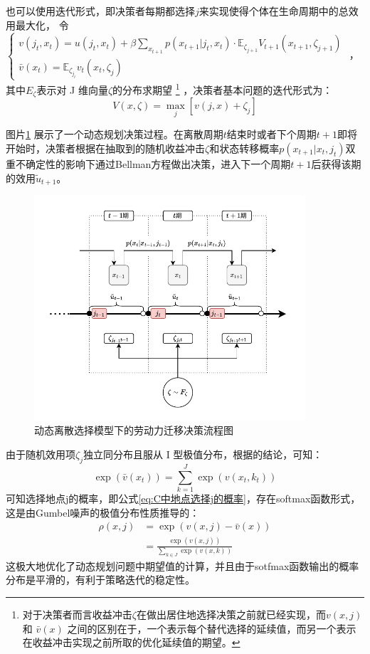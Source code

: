 \documentclass[
  a4paper,
  zihao=-4,
  fontset=mac,
  AutoFakeBold,
  AutoFakeSlant,
  oneside]{ctexbook}
\let\oldfootnote\footnote
\renewcommand{\footnote}[1]{%
  \oldfootnote{\setstretch{1.5}#1}%
}
\begin{document}
也可以使用迭代形式，即决策者每期都选择$j$来实现使得个体在生命周期中的总效用最大化，
令
$\begin{cases}
  v(j_{t},x_{t})=u(j_{t} ,x_{t})+\beta \sum_{x_{t+1}} p(x_{t+1}|j_t,x_t) \cdot \mathbb{E}_{\zeta_{j+1}} V_{t+1}(x_{t+1},\zeta_{j+1})
  \\
  \bar v(x_{t})=\mathbb{E}_{\zeta_{j_t}} v_{t}(x_{t},\zeta_{j})
\end{cases}$
，其中$E_{\zeta}$表示对 J 维向量$\zeta$的分布求期望\footnote{对于决策者而言收益冲击$\zeta$在做出居住地选择决策之前就已经实现，而$v(x,j)$ 和 $\bar v(x)$ 之间的区别在于，一个表示每个替代选择的延续值，而另一个表示在收益冲击实现之前所取的优化延续值的期望。}，决策者基本问题的迭代形式为：
\begin{equation}
V(x,\zeta)=\max\limits_{j}[v(j,x)+\zeta_{j}]
\end{equation}

图片\ref{fig:migration_flow_resized2} 展示了一个动态规划决策过程。在离散周期$t$结束时或者下个周期$t+1$即将开始时，决策者根据在抽取到的随机收益冲击$\zeta$和状态转移概率$p(x_{t+1}|x_t,j_t)$双重不确定性的影响下通过Bellman方程做出决策，进入下一个周期$t+1$后获得该期的效用$\tilde u_{t+1}$。

\begin{figure}[!ht]
\centering
\caption{动态离散选择模型下的劳动力迁移决策流程图}
\label{fig:migration_flow_resized2}
\includegraphics[width=0.9\textwidth]{images/dynamicsequence2.drawio.pdf}
\end{figure}

由于随机效用项$\zeta_j$独立同分布且服从 I 型极值分布，根据\textcite{mcfaddenConditionalLogitAnalysis1973,rustOptimalReplacementGMC1987,rustStructuralEstimationMarkov1994}的结论，可知：
\begin{equation}
  \exp(\bar v(x_t))=\sum\limits_{k=1}^{J}\exp(v(x_t,k_t))
\end{equation}
可知选择地点j的概率，即公式\ref{eq:C中地点选择j的概率}，存在softmax函数形式，这是由Gumbel噪声的极值分布性质推导的：
\begin{align}
\rho(x,j)&=\exp(v(x,j)-\bar v(x))
\\&=\frac{\exp(v(x,j))}{\sum\limits_{k\in J} \exp(v(x,k))} \label{eq:地点选择概率}
\end{align}
这极大地优化了动态规划问题中期望值的计算，并且由于sotfmax函数输出的概率分布是平滑的，有利于策略迭代的稳定性。
\end{document}
